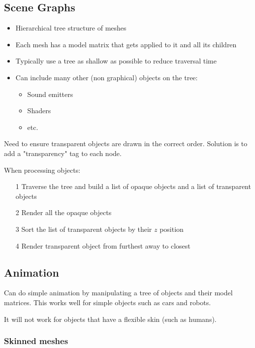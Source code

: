 \documentclass[a4paper]{article}
\begin{document}
\subsection{Scene Graphs}

\begin{itemize}
  \item Hierarchical tree structure of meshes
  \item Each mesh has a model matrix that gets applied to it and all its
    children
  \item Typically use a tree as shallow as possible to reduce traversal time
  \item Can include many other (non graphical) objects on the tree:
    \begin{itemize}
      \item Sound emitters
      \item Shaders
      \item etc.
    \end{itemize}
\end{itemize}

Need to ensure transparent objects are drawn in the correct order. Solution is
to add a "transparency" tag to each node.

When processing objects:
\begin{enumerate}
  \item[1] Traverse the tree and build a list of opaque objects and a list of
    transparent objects
  \item[2] Render all the opaque objects
  \item[3] Sort the list of transparent objects by their $z$ position
  \item[4] Render transparent object from furthest away to closest
\end{enumerate}

\subsection{Animation}

Can do simple animation by manipulating a tree of objects and their model
matrices. This works well for simple objects such as cars and robots.

It will not work for objects that have a flexible skin (such as humans).

\subsubsection{Skinned meshes}
\end{document}

